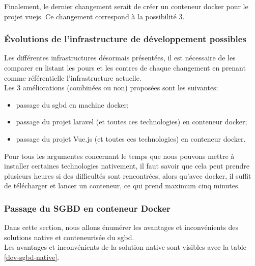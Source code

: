 \documentclass[
    iai, %
    il, %
]{heig-tb}
\begin{document}
Finalement, le dernier changement serait de créer un \Gls{conteneur} \Gls{docker} pour le projet \Gls{vuejs}. Ce changement correspond à la possibilité 3.


\clearpage


\subsubsection{Évolutions de l'infrastructure de développement possibles}
Les différentes infrastructures désormais présentées, il est nécessaire de les comparer en listant les pours et les contres de chaque changement en prenant comme référentielle l'infrastructure actuelle. \\
Les 3 améliorations (combinées ou non) proposées sont les suivantes:
\begin{itemize}
    \item passage du \Gls{sgbd} en machine \Gls{docker};
    \item passage du projet \Gls{laravel} (et toutes ces technologies) en \Gls{conteneur} \Gls{docker};
    \item passage du projet Vue.js (et toutes ces technologies) en \Gls{conteneur} \Gls{docker}.
\end{itemize}

Pour tous les argumentes concernant le temps que nous pouvons mettre à installer certaines technologies nativement, il faut savoir que cela peut prendre plusieurs heures si des difficultés sont rencontrées, alors qu'avec \Gls{docker}, il suffit de télécharger et lancer un \Gls{conteneur}, ce qui prend maximum cinq minutes.

\subsubsection{Passage du SGBD en conteneur Docker}
Dans cette section, nous allons énumérer les avantages et inconvénients des solutions native et conteneurisée du \Gls{sgbd}. \\
Les avantages et inconvénients de la solution native sont visibles avec la table \ref{dev-sgbd-native}.
\end{document}
